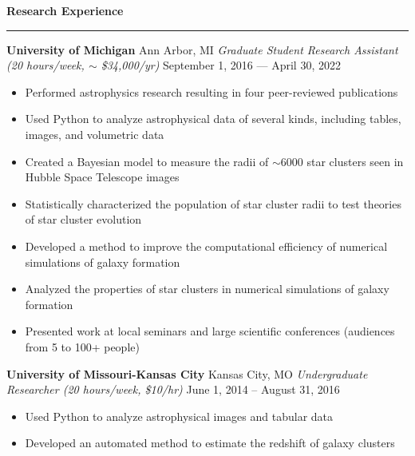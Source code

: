 \documentclass[10pt]{article}
\newcommand{\header}[1]{\vspace{1.5em}\par \textbf{\large #1}\strut\hrule\vspace{-0.9em}}
\newcommand{\actionHeader}[2]{\vspace{0.6em}\textbf{#1} \hfill #2}
\newcommand{\actionHeaderSecondLine}[2]{\newline \textit{#1} \hfill #2}
\begin{document}
\header{Research Experience}
\actionHeader{University of Michigan}{Ann Arbor, MI}
\actionHeaderSecondLine{Graduate Student Research Assistant (20 hours/week, $\sim$ \$34,000/yr)}{September 1, 2016 --- April 30, 2022}
\begin{itemize}
    \item Performed astrophysics research resulting in four peer-reviewed publications
    \item Used Python to analyze astrophysical data of several kinds, including tables, images, and volumetric data
    \item Created a Bayesian model to measure the radii of $\sim$6000 star clusters seen in Hubble Space Telescope images 
    \item Statistically characterized the population of star cluster radii to test theories of star cluster evolution
    \item Developed a method to improve the computational efficiency of numerical simulations of galaxy formation
    \item Analyzed the properties of star clusters in numerical simulations of galaxy formation
    \item Presented work at local seminars and large scientific conferences (audiences from 5 to 100+ people)
\end{itemize}

\actionHeader{University of Missouri-Kansas City}{Kansas City, MO}
\actionHeaderSecondLine{Undergraduate Researcher (20 hours/week, \$10/hr)}{June 1, 2014 -- August 31, 2016} 
\begin{itemize}
    \item Used Python to analyze astrophysical images and tabular data
    \item Developed an automated method to estimate the redshift of galaxy clusters
\end{itemize}
\end{document}

